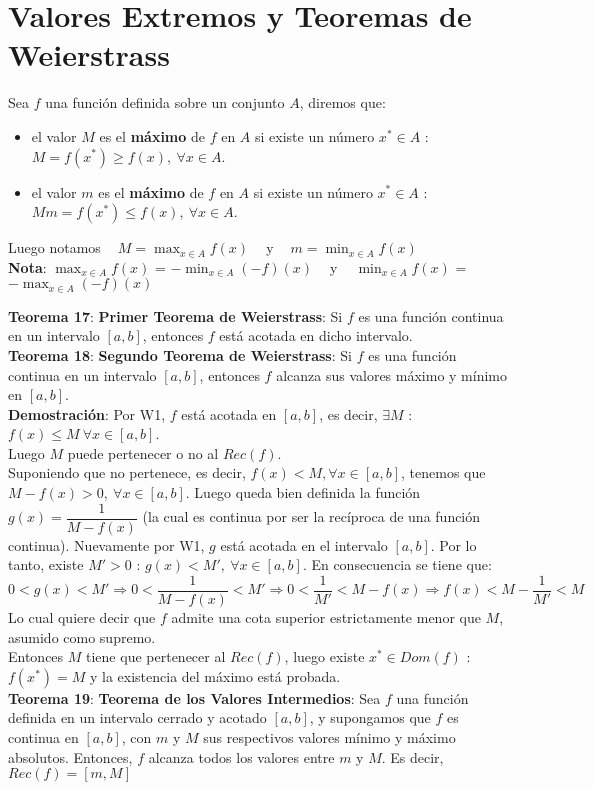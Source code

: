 \documentclass[11pt,a4paper]{article}
\begin{document}
\section{Valores Extremos y Teoremas de Weierstrass}
Sea $f$ una funci\'on definida sobre un conjunto $A$, diremos que:
\begin{itemize}
\item el valor $M$ es el \textbf{m\'aximo} de $f$ en $A$ si existe un n\'umero $x^* \in A$ : $M = f(x^*) \geq f(x),\ \forall x \in A$.
\item el valor $m$ es el \textbf{m\'aximo} de $f$ en $A$ si existe un n\'umero $x^* \in A$ : $Mm= f(x^*) \leq f(x),\ \forall x \in A$.
\end{itemize}
Luego notamos $\ \ \ \ M = \displaystyle{\max_{x\in A} f(x)} \ \ \ \ $ y $\ \ \ \ m = \displaystyle{\min_{x\in A} f(x)}$\\

\textbf{Nota}: $\displaystyle{\max_{x\in A} f(x)}$ = $\displaystyle{-\min_{x\in A} (-f)(x)} \ \ \ \ $ y $\ \ \ \ \displaystyle{\min_{x\in A} f(x)}$ = $\displaystyle{-\max_{x\in A} (-f)(x)}$

\noindent \textbf{Teorema 17}: \textbf{Primer Teorema de Weierstrass}: Si $f$ es una funci\'on continua en un intervalo $[a,b]$, entonces $f$ est\'a acotada en dicho intervalo.\\

\noindent \textbf{Teorema 18}: \textbf{Segundo Teorema de Weierstrass}: Si $f$ es una funci\'on continua en un intervalo $[a,b]$, entonces $f$ alcanza sus valores m\'aximo y m\'inimo en $[a,b]$.\\
\textbf{Demostraci\'on}: Por W1, $f$ est\'a acotada en $[a,b]$, es decir, $\exists M$ : $f(x)\leq M\ \forall x \in [a,b]$.\\ Luego $M$ puede pertenecer o no al $Rec(f)$. \\ 
Suponiendo que no pertenece, es decir, $f(x)<M, \forall x \in [a,b]$, tenemos que $M-f(x)>0,\ \forall x \in [a,b]$. Luego queda bien definida la funci\'on $g(x)=\dfrac{1}{M-f(x)}$ (la cual es continua por ser la rec\'iproca de una funci\'on continua). Nuevamente por W1, $g$ est\'a acotada en el intervalo $[a,b]$. Por lo tanto, existe $M' > 0$ : $g(x) < M',\ \forall x \in [a,b]$. En consecuencia se tiene que:
$$0 < g(x) < M' \Rightarrow 0 < \dfrac{1}{M-f(x)} < M' \Rightarrow 0 < \dfrac{1}{M'} < M - f(x) \Rightarrow f(x) < M-\dfrac{1}{M'} < M$$
Lo cual quiere decir que $f$ admite una cota superior estrictamente menor que $M$, asumido como supremo.\\
\indent Entonces $M$ tiene que pertenecer al $Rec(f)$, luego existe $x^* \in Dom(f)$ : $f(x^*)=M$ y la existencia del m\'aximo est\'a probada.\\

\noindent \textbf{Teorema 19}: \textbf{Teorema de los Valores Intermedios}: Sea $f$ una funci\'on definida en un intervalo cerrado y acotado $[a,b]$, y supongamos que $f$ es continua en $[a,b]$, con $m$ y $M$ sus respectivos valores m\'inimo y m\'aximo absolutos. Entonces, $f$ alcanza todos los valores entre $m$ y $M$. Es decir, $Rec(f) = [m,M]$
\end{document}
